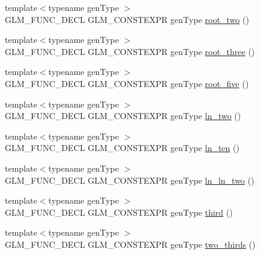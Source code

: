 \begin{DoxyCompactItemize}
\item 
{\footnotesize template$<$typename gen\+Type $>$ }\\G\+L\+M\+\_\+\+F\+U\+N\+C\+\_\+\+D\+E\+C\+L G\+L\+M\+\_\+\+C\+O\+N\+S\+T\+E\+X\+P\+R gen\+Type \hyperlink{group__gtc__constants_ga74e607d29020f100c0d0dc46ce2ca950}{root\+\_\+two} ()
\item 
{\footnotesize template$<$typename gen\+Type $>$ }\\G\+L\+M\+\_\+\+F\+U\+N\+C\+\_\+\+D\+E\+C\+L G\+L\+M\+\_\+\+C\+O\+N\+S\+T\+E\+X\+P\+R gen\+Type \hyperlink{group__gtc__constants_ga4f286be4abe88be1eed7d2a9f6cb193e}{root\+\_\+three} ()
\item 
{\footnotesize template$<$typename gen\+Type $>$ }\\G\+L\+M\+\_\+\+F\+U\+N\+C\+\_\+\+D\+E\+C\+L G\+L\+M\+\_\+\+C\+O\+N\+S\+T\+E\+X\+P\+R gen\+Type \hyperlink{group__gtc__constants_gae9ebbded75b53d4faeb1e4ef8b3347a2}{root\+\_\+five} ()
\item 
{\footnotesize template$<$typename gen\+Type $>$ }\\G\+L\+M\+\_\+\+F\+U\+N\+C\+\_\+\+D\+E\+C\+L G\+L\+M\+\_\+\+C\+O\+N\+S\+T\+E\+X\+P\+R gen\+Type \hyperlink{group__gtc__constants_ga24f4d27765678116f41a2f336ab7975c}{ln\+\_\+two} ()
\item 
{\footnotesize template$<$typename gen\+Type $>$ }\\G\+L\+M\+\_\+\+F\+U\+N\+C\+\_\+\+D\+E\+C\+L G\+L\+M\+\_\+\+C\+O\+N\+S\+T\+E\+X\+P\+R gen\+Type \hyperlink{group__gtc__constants_gaf97ebc6c059ffd788e6c4946f71ef66c}{ln\+\_\+ten} ()
\item 
{\footnotesize template$<$typename gen\+Type $>$ }\\G\+L\+M\+\_\+\+F\+U\+N\+C\+\_\+\+D\+E\+C\+L G\+L\+M\+\_\+\+C\+O\+N\+S\+T\+E\+X\+P\+R gen\+Type \hyperlink{group__gtc__constants_gaca94292c839ed31a405ab7a81ae7e850}{ln\+\_\+ln\+\_\+two} ()
\item 
{\footnotesize template$<$typename gen\+Type $>$ }\\G\+L\+M\+\_\+\+F\+U\+N\+C\+\_\+\+D\+E\+C\+L G\+L\+M\+\_\+\+C\+O\+N\+S\+T\+E\+X\+P\+R gen\+Type \hyperlink{group__gtc__constants_ga3077c6311010a214b69ddc8214ec13b5}{third} ()
\item 
{\footnotesize template$<$typename gen\+Type $>$ }\\G\+L\+M\+\_\+\+F\+U\+N\+C\+\_\+\+D\+E\+C\+L G\+L\+M\+\_\+\+C\+O\+N\+S\+T\+E\+X\+P\+R gen\+Type \hyperlink{group__gtc__constants_ga9b4d2f4322edcf63a6737b92a29dd1f5}{two\+\_\+thirds} ()
\item 

\end{DoxyCompactItemize}
